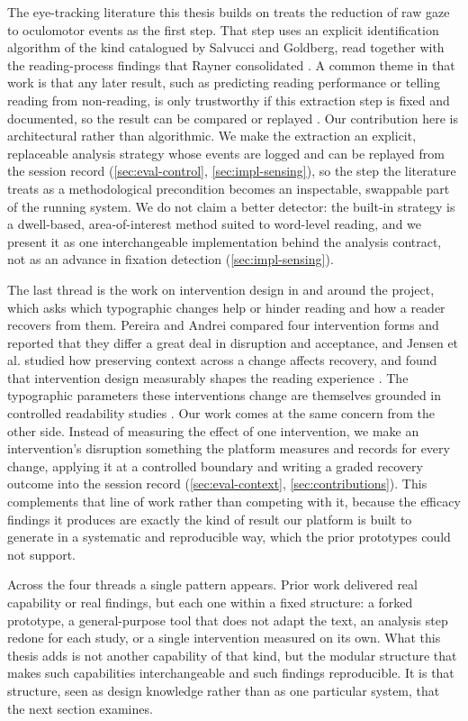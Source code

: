 The eye-tracking literature this thesis builds on treats the reduction of raw gaze to oculomotor events as the first step.
That step uses an explicit identification algorithm of the kind catalogued by Salvucci and Goldberg, read together with the reading-process findings that Rayner consolidated \cite{salvucci2000identifying, rayner1998eyemovements}.
A common theme in that work is that any later result, such as predicting reading performance or telling reading from non-reading, is only trustworthy if this extraction step is fixed and documented, so the result can be compared or replayed \cite{guan2022predictive, landsmann2019classification}.
Our contribution here is architectural rather than algorithmic.
We make the extraction an explicit, replaceable analysis strategy whose events are logged and can be replayed from the session record (\cref{sec:eval-control}, \cref{sec:impl-sensing}), so the step the literature treats as a methodological precondition becomes an inspectable, swappable part of the running system.
We do not claim a better detector: the built-in strategy is a dwell-based, area-of-interest method suited to word-level reading, and we present it as one interchangeable implementation behind the analysis contract, not as an advance in fixation detection (\cref{sec:impl-sensing}).

The last thread is the work on intervention design in and around the project, which asks which typographic changes help or hinder reading and how a reader recovers from them.
Pereira and Andrei compared four intervention forms and reported that they differ a great deal in disruption and acceptance, and Jensen et al. studied how preserving context across a change affects recovery, and found that intervention design measurably shapes the reading experience \cite{pereira2024typography, jensen2025context}.
The typographic parameters these interventions change are themselves grounded in controlled readability studies \cite{rello2016makeitbig, beymer2008eyetracking}.
Our work comes at the same concern from the other side.
Instead of measuring the effect of one intervention, we make an intervention's disruption something the platform measures and records for every change, applying it at a controlled boundary and writing a graded recovery outcome into the session record (\cref{sec:eval-context}, \cref{sec:contributions}).
This complements that line of work rather than competing with it, because the efficacy findings it produces are exactly the kind of result our platform is built to generate in a systematic and reproducible way, which the prior prototypes could not support.

Across the four threads a single pattern appears.
Prior work delivered real capability or real findings, but each one within a fixed structure: a forked prototype, a general-purpose tool that does not adapt the text, an analysis step redone for each study, or a single intervention measured on its own.
What this thesis adds is not another capability of that kind, but the modular structure that makes such capabilities interchangeable and such findings reproducible.
It is that structure, seen as design knowledge rather than as one particular system, that the next section examines.

